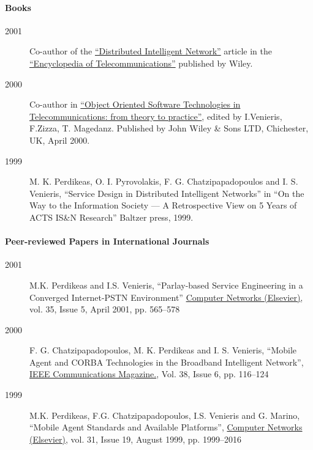 \documentclass[10pt,a4paper]{article} %
\begin{document}

\paragraph{Books}

  \begin{description}
  \item[2001] Co-author of the 
    \href{http://onlinelibrary.wiley.com/doi/10.1002/0471219282.eot257/full}{``Distributed Intelligent Network''} article in the
    \href{http://eu.wiley.com/WileyCDA/WileyTitle/productCd-0471369721.html}{``Encyclopedia of Telecommunications''} published by Wiley.
  \item[2000] Co-author in \href{http://eu.wiley.com/WileyCDA/WileyTitle/productCd-0471623792.html}{``Object Oriented Software Technologies in Telecommunications: from theory to practice''}, edited by I.Venieris, F.Zizza, T. Magedanz. Published by John Wiley \& Sons LTD, Chichester, UK, April 2000.
  \item[1999] M. K. Perdikeas, O. I. Pyrovolakis, F. G. Chatzipapadopoulos and I. S. Venieris, ``Service Design in Distributed Intelligent Networks'' in ``On the Way to the Information Society --- A Retrospective View on 5 Years of ACTS IS\&N Research'' Baltzer press, 1999.
  \end{description}
  \paragraph{Peer-reviewed Papers in International Journals}
  \begin{description}
  \item[2001] M.K. Perdikeas and I.S. Venieris,  ``Parlay-based Service Engineering in a Converged Internet-PSTN Environment'' \href{http://www.sciencedirect.com/science/journal/13891286}{Computer Networks (Elsevier)},
    vol. 35, Issue 5, April 2001, pp. 565--578
  \item[2000]F. G. Chatzipapadopoulos, M. K. Perdikeas and I. S. Venieris, ``Mobile Agent and CORBA Technologies in the Broadband Intelligent Network'', \href{http://www.comsoc.org/commag}{IEEE Communications Magazine.}, Vol. 38, Issue 6, pp. 116--124
    \item[1999] M.K. Perdikeas, F.G. Chatzipapadopoulos, I.S. Venieris and G. Marino, ``Mobile Agent Standards and Available Platforms'', \href{http://www.sciencedirect.com/science/journal/13891286}{Computer Networks (Elsevier)}, vol. 31, Issue 19, August 1999, pp. 1999--2016
  \end{description}
\end{document}
